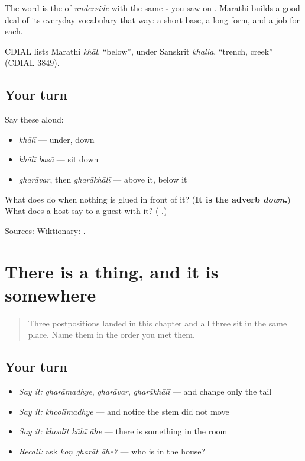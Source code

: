 The word is the \textbf{} of \emph{underside} with the same \textbf{-} you saw on \textbf{}. Marathi builds a good deal of its everyday vocabulary that way: a short base, a long form, and a job for each.

\begin{cousinweb}
CDIAL lists Marathi \emph{khāl}, \textquotedblleft{}below\textquotedblright{}, under Sanskrit \emph{khalla}, \textquotedblleft{}trench, creek\textquotedblright{} (CDIAL 3849).
\end{cousinweb}

\subsection*{Your turn}
Say these aloud:

\begin{itemize}
\raggedright
  \item \emph{khālī} — under, down
  \item \emph{khālī basā} — sit down
  \item \emph{gharāvar}, then \emph{gharākhālī} — above it, below it
\end{itemize}

\begin{tcolorbox}[breakable,colback=teal!4,colframe=teal!35!black,title={Before you move on}]
What does \textbf{} do when nothing is glued in front of it? (\textbf{It is the adverb \emph{down}.}) What does a host say to a guest with it? (\textbf{ }.)

Sources: \href{https://en.wiktionary.org/wiki/\%E0\%A4\%96\%E0\%A4\%BE\%E0\%A4\%B2\%E0\%A5\%80}{Wiktionary: }.
\end{tcolorbox}
\section[\texorpdfstring{\mr{मध्ये} · \mr{वर} · \mr{खाली} (madhye · var · khālī)}{मध्ये · वर · खाली (madhye · var · khālī)}]{There is a thing, and it is somewhere}

\label{lesson:MR-R42-inside-outside}



\begin{quote}
Three postpositions landed in this chapter and all three sit in the same place. Name them in the order you met them.
\end{quote}

\subsection*{Your turn}
\begin{itemize}
\raggedright
  \item \emph{Say it:} \emph{gharāmadhye}, \emph{gharāvar}, \emph{gharākhālī} — and change only the tail
  \item \emph{Say it:} \emph{khoolīmadhye} — and notice the stem did not move
  \item \emph{Say it:} \emph{khoolīt kāhī āhe} — there is something in the room
  \item \emph{Recall:} ask \emph{koṇ gharāt āhe?} — who is in the house?
\end{itemize}

